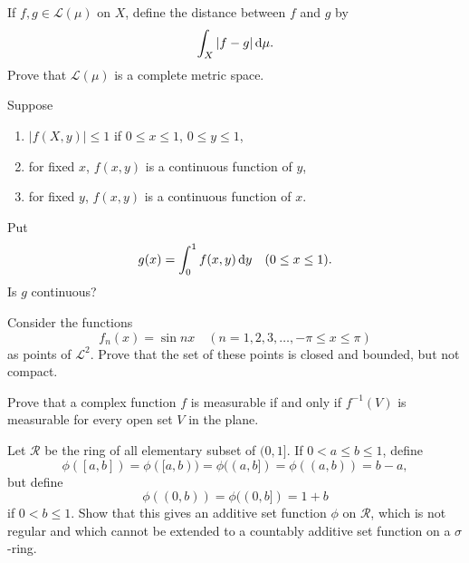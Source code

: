 \begin{myexercise}
    \label{ex:11.11}
    If $f,g \in \mathscr{L}(\mu)$ on $X$,
    define the distance between $f$ and $g$ by
    \begin{equation*}
        \int_{X} \left| f-g \right| \d \mu .
    \end{equation*}
    Prove that $\mathscr{L}(\mu)$ is a complete metric space.
\end{myexercise}


\begin{myexercise}
    \label{ex:11.12}
    Suppose
    \begin{enumerate}
        \item $|f(X,y)|\leq 1$ if $0 \leq x \leq 1$, $0 \leq y \leq 1$,
        \item for fixed $x$, $f(x,y)$ is a continuous function of $y$,
        \item for fixed $y$, $f(x,y)$ is a continuous function of $x$.
    \end{enumerate}
    Put
    \begin{equation*}
        g(x) = \int_{0}^{1} f(x,y) \d y
        \quad
        (0 \leq x \leq 1).
    \end{equation*}
    Is $g$ continuous?
\end{myexercise}


\begin{myexercise}
    \label{ex:11.13}
    Consider the functions
    \begin{equation*}
        f_n(x) = \sin n x
        \quad
        (n=1,2,3,\dots, -\pi \leq x \leq \pi)
    \end{equation*}
    as points of $\mathscr{L}^2$.
    Prove that the set of these points is closed and bounded,
    but not compact.
\end{myexercise}


\begin{myexercise}
    \label{ex:11.14}
    Prove that a complex function $f$ is measurable
    if and only if $f^{-1}(V)$ is measurable
    for every open set $V$ in the plane.
\end{myexercise}


\begin{myexercise}
    \label{ex:11.15}
    Let $\mathscr{R}$ be the ring of all elementary subset of $(0,1]$.
    If $0 < a \leq b \leq 1$, define
    \begin{equation*}
        \phi([a,b]) =
        \phi([a,b)) =
        \phi((a,b]) =
        \phi((a,b)) =
        b-a,
    \end{equation*}
    but define
    \begin{equation*}
        \phi((0,b)) =
        \phi((0,b]) =
        1+b
    \end{equation*}
    if $0 < b \leq 1$.
    Show that this gives an additive set function $\phi$ on $\mathscr{R}$,
    which is not regular and which cannot be extended to a countably additive set function on a $\sigma$-ring.
\end{myexercise}


